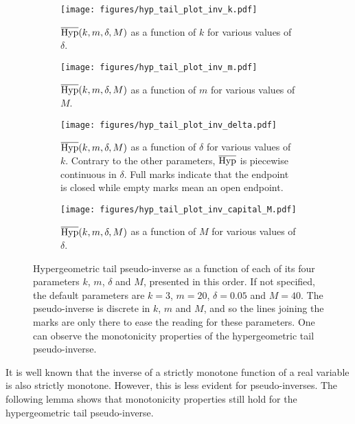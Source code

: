 \documentclass[twoside,11pt]{article}
\newcommand{\HypInv}{\overline{\textnormal{Hyp}}}
\begin{document}
\begin{figure}[p]
\centering
\begin{subfigure}[t]{0.47\textwidth}
    \centering
    \texttt{[image: figures/hyp\_tail\_plot\_inv\_k.pdf]}
    \caption{$\HypInv(k,m,\delta,M)$ as a function of $k$ for various values of $\delta$.}
    \label{fig:hyp_tail_inv_plot_k}
\end{subfigure}\hfill
\begin{subfigure}[t]{0.47\textwidth}
    \centering
    \texttt{[image: figures/hyp\_tail\_plot\_inv\_m.pdf]}
    \caption{$\HypInv(k,m,\delta,M)$ as a function of $m$ for various values of $M$.}
    \label{fig:hyp_tail_inv_plot_m}
\end{subfigure}

\vspace{15pt}

\begin{subfigure}[t]{0.47\textwidth}
    \centering
    \texttt{[image: figures/hyp\_tail\_plot\_inv\_delta.pdf]}
    \caption{$\HypInv(k,m,\delta,M)$ as a function of $\delta$ for various values of $k$. Contrary to the other parameters, $\HypInv$ is piecewise continuous in $\delta$. Full marks indicate that the endpoint is closed while empty marks mean an open endpoint.}
    \label{fig:hyp_tail_plot_inv_delta}
\end{subfigure}\hfill
\begin{subfigure}[t]{0.47\textwidth}
    \centering
    \texttt{[image: figures/hyp\_tail\_plot\_inv\_capital\_M.pdf]}
    \caption{$\HypInv(k,m,\delta,M)$ as a function of $M$ for various values of $\delta$.}
    \label{fig:hyp_tail_plot_inv_M}
\end{subfigure}
\caption{Hypergeometric tail pseudo-inverse as a function of each of its four parameters $k$, $m$, $\delta$ and $M$, presented in this order. If not specified, the default parameters are $k=3$, $m=20$, $\delta=0.05$ and $M=40$. The pseudo-inverse is discrete in $k$, $m$ and $M$, and so the lines joining the marks are only there to ease the reading for these parameters. One can observe the monotonicity properties of the hypergeometric tail pseudo-inverse.}
\label{fig:hyp_tail_plot_inv}
\end{figure}

It is well known that the inverse of a strictly monotone function of a real variable is also strictly monotone.
However, this is less evident for pseudo-inverses.
The following lemma shows that monotonicity properties still hold for the hypergeometric tail pseudo-inverse.
\end{document}
